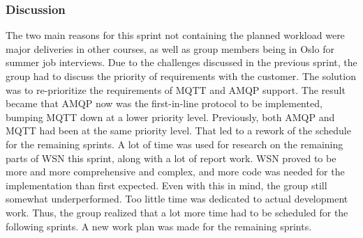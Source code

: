 \subsubsection{Discussion}
\label{subsec:project_lifecycle-development-sprint_4-discussion}

The two main reasons for this sprint not containing the planned workload were major deliveries in other courses, as well as group members being in Oslo for summer job interviews.
Due to the challenges discussed in the previous sprint, the group had to discuss the priority of requirements with the customer. The solution was to re-prioritize the requirements of MQTT and AMQP support. The result became that AMQP now was the first-in-line protocol to be implemented, bumping MQTT down at a lower priority level. Previously, both AMQP and MQTT had been at the same priority level. That led to a rework of the schedule for the remaining sprints. A lot of time was used for research on the remaining parts of WSN this sprint, along with a lot of report work. WSN proved to be more and more comprehensive and complex, and more code was needed for the implementation than first expected. Even with this in mind, the group still somewhat underperformed. Too little time was dedicated to actual development work. Thus, the group realized that a lot more time had to be scheduled for the following sprints. A new work plan was made for the remaining sprints.


